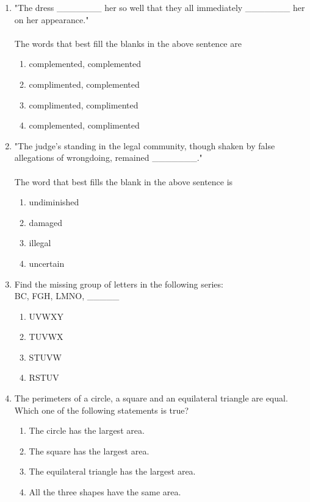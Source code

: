 \documentclass[journal]{IEEEtran}
\begin{document}
\begin{enumerate}
    \item \label{1} "The dress \_\_\_\_\_\_\_ her so well that they all immediately \_\_\_\_\_\_\_ her on her appearance."\\ \\ The words that best fill the blanks in the above sentence are
        \begin{enumerate}
            \item complemented, complemented
            \item complimented, complemented
            \item complimented, complimented
            \item complemented, complimented
        \end{enumerate} 

    \item "The judge's standing in the legal community, though shaken by false allegations of wrongdoing, remained \_\_\_\_\_\_\_." \\ \\ The word that best fills the blank in the above sentence is 
        \begin{enumerate}
            \item undiminished
            \item damaged
            \item illegal
            \item uncertain
        \end{enumerate}

    \item Find the missing group of letters in the following series:\\ BC, FGH, LMNO, \_\_\_\_\_
        \begin{enumerate}
            \item UVWXY
            \item TUVWX
            \item STUVW
            \item RSTUV
        \end{enumerate}

    \item The perimeters of a circle, a square and an equilateral triangle are equal. Which one of the following statements is true?
        \begin{enumerate}
            \item The circle has the largest area.
            \item The square has the largest area.
            \item The equilateral triangle has the largest area.
            \item All the three shapes have the same area.
        \end{enumerate}


\end{enumerate}
\end{document}
